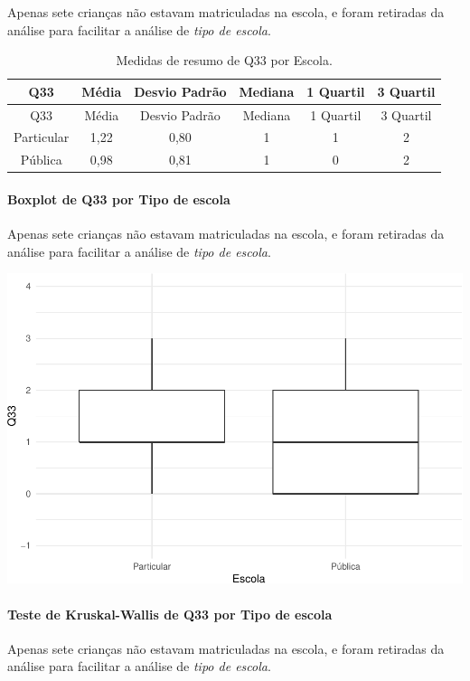 \documentclass[]{article}
\let\oldparagraph\paragraph
\renewcommand{\paragraph}[1]{\oldparagraph{#1}\mbox{}}
\begin{document}
Apenas sete crianças não estavam matriculadas na escola, e foram retiradas da análise para facilitar a análise de \emph{tipo de escola}.

\begin{longtable}[]{@{}cccccc@{}}
\caption{\label{tab:unnamed-chunk-1177}Medidas de resumo de Q33 por Escola.}\tabularnewline
\toprule
Q33 & Média & Desvio Padrão & Mediana & 1 Quartil & 3 Quartil\tabularnewline
\midrule
\endfirsthead
\toprule
Q33 & Média & Desvio Padrão & Mediana & 1 Quartil & 3 Quartil\tabularnewline
\midrule
\endhead
Particular & 1,22 & 0,80 & 1 & 1 & 2\tabularnewline
Pública & 0,98 & 0,81 & 1 & 0 & 2\tabularnewline
\bottomrule
\end{longtable}

\hypertarget{boxplot-de-q33-por-tipo-de-escola}{%
\paragraph{Boxplot de Q33 por Tipo de escola}\label{boxplot-de-q33-por-tipo-de-escola}}

Apenas sete crianças não estavam matriculadas na escola, e foram retiradas da análise para facilitar a análise de \emph{tipo de escola}.

\begin{center}\includegraphics[width=0.75\linewidth]{relatorio_covid19_files/figure-latex/unnamed-chunk-1178-1} \end{center}

\hypertarget{teste-de-kruskal-wallis-de-q33-por-tipo-de-escola}{%
\paragraph{Teste de Kruskal-Wallis de Q33 por Tipo de escola}\label{teste-de-kruskal-wallis-de-q33-por-tipo-de-escola}}

Apenas sete crianças não estavam matriculadas na escola, e foram retiradas da análise para facilitar a análise de \emph{tipo de escola}.
\end{document}

